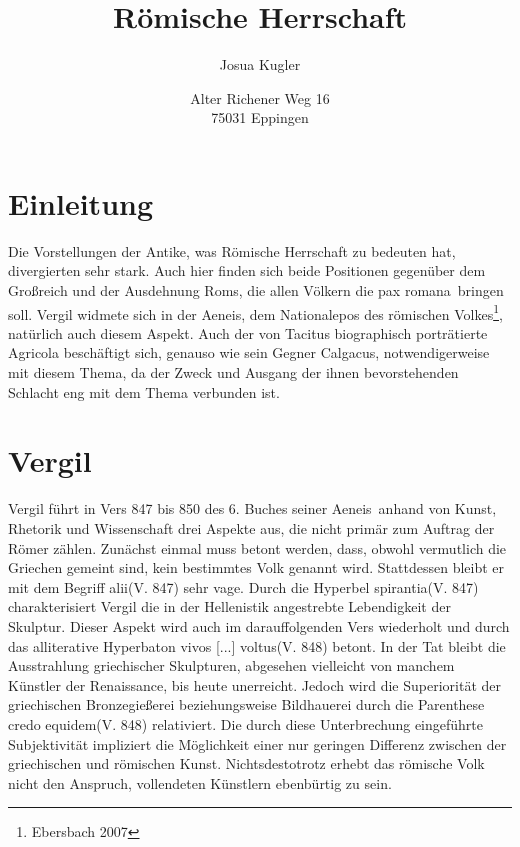 \documentclass[12pt]{article}
\title{Römische Herrschaft}
\author{Josua Kugler}
\date{Alter Richener Weg 16\\ 75031 Eppingen}
\begin{document}
	\pagestyle{empty}
	\maketitle
	\thispagestyle{empty}
	\newpage
	\thispagestyle{empty}
	\tableofcontents
	\newpage
	\pagestyle{plain}
	\section{Einleitung}
	Die Vorstellungen der Antike, was Römische Herrschaft zu bedeuten hat, divergierten sehr stark. Auch hier finden sich beide Positionen gegenüber dem Großreich und der Ausdehnung Roms, die allen Völkern die \glqq pax romana\grqq\ bringen soll.
	Vergil widmete sich in der Aeneis, dem Nationalepos des römischen Volkes\footnote{Ebersbach 2007}, natürlich auch diesem Aspekt. Auch der von Tacitus biographisch porträtierte Agricola beschäftigt sich, genauso wie sein Gegner Calgacus, notwendigerweise mit diesem Thema, da der Zweck und Ausgang der ihnen bevorstehenden Schlacht eng mit dem Thema verbunden ist.
	\section{Vergil}
	Vergil führt in Vers 847 bis 850 des 6. Buches seiner \glqq Aeneis\grqq\ anhand von Kunst, Rhetorik und Wissenschaft drei Aspekte aus, die nicht primär zum Auftrag der Römer zählen. Zunächst einmal muss betont werden, dass, obwohl vermutlich die Griechen gemeint sind, kein bestimmtes Volk genannt wird. Stattdessen bleibt er mit dem Begriff \glqq alii\grqq(V. 847) sehr vage. Durch die Hyperbel \glqq spirantia\grqq(V. 847) charakterisiert Vergil die in der Hellenistik angestrebte Lebendigkeit der Skulptur. Dieser Aspekt wird auch im darauffolgenden Vers wiederholt und durch das alliterative Hyperbaton \glqq vivos [...] voltus\grqq(V. 848) betont. In der Tat bleibt die Ausstrahlung griechischer Skulpturen, abgesehen vielleicht von manchem Künstler der Renaissance, bis heute unerreicht. Jedoch wird die Superiorität der griechischen Bronzegießerei beziehungsweise Bildhauerei durch die Parenthese \glqq credo equidem\grqq(V. 848) relativiert. Die durch diese Unterbrechung eingeführte Subjektivität impliziert die Möglichkeit einer nur geringen Differenz zwischen der griechischen und römischen Kunst.
	Nichtsdestotrotz erhebt das römische Volk nicht den Anspruch, vollendeten Künstlern ebenbürtig zu sein. 
	
\end{document}
